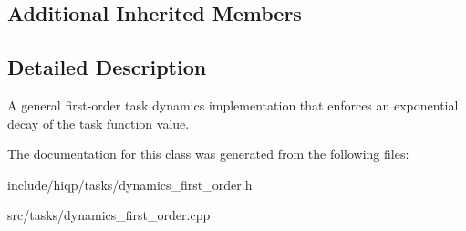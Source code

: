 \subsection*{Additional Inherited Members}


\subsection{Detailed Description}
A general first-\/order task dynamics implementation that enforces an exponential decay of the task function value. 

The documentation for this class was generated from the following files\-:\begin{DoxyCompactItemize}
\item 
include/hiqp/tasks/dynamics\-\_\-first\-\_\-order.\-h\item 
src/tasks/dynamics\-\_\-first\-\_\-order.\-cpp\end{DoxyCompactItemize}
